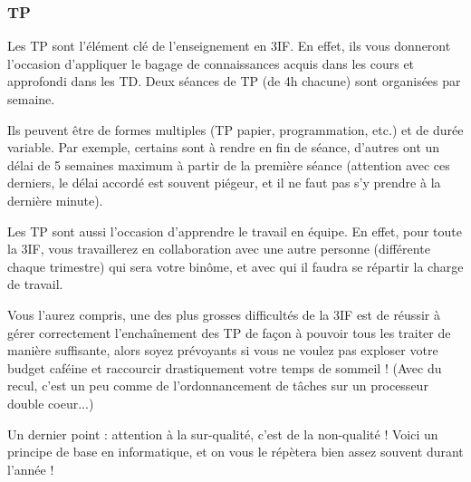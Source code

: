 \subsubsection{TP}
Les TP sont l'élément clé de l'enseignement en 3IF. En effet, ils
vous donneront l'occasion d'appliquer le bagage de connaissances acquis dans
les cours et approfondi dans les TD. Deux séances de TP (de 4h chacune) sont
organisées par semaine.

\vspace{1em}

Ils peuvent être de formes multiples (TP papier, programmation, etc.)
    et de durée variable. Par exemple, certains sont à rendre en fin de séance,
    d'autres ont un délai de 5 semaines maximum à partir de la première séance (attention
	avec ces derniers, le délai accordé est souvent piégeur, et il ne faut pas s'y prendre à la dernière minute).
    
\vspace{1em}

Les TP sont aussi l'occasion d'apprendre le travail en équipe. En effet, pour toute la
3IF, vous travaillerez en collaboration avec une autre personne (différente chaque trimestre) qui
sera votre binôme, et avec qui il faudra se répartir la charge de travail.

\vspace{1em}

Vous l'aurez compris, une des plus grosses difficultés de la 3IF est de réussir
à gérer correctement l'enchaînement des TP de façon à pouvoir tous les
traiter de manière suffisante, alors soyez prévoyants si vous ne voulez pas
exploser votre budget caféine et raccourcir drastiquement votre temps de sommeil ! (Avec
du recul, c'est un peu comme de l'ordonnancement de tâches sur un processeur
 double coeur...) 

\vspace{1em}

Un dernier point : attention à la sur-qualité, c'est de la non-qualité ! Voici un principe de
base en informatique, et on vous le répètera bien assez souvent durant l'année !
